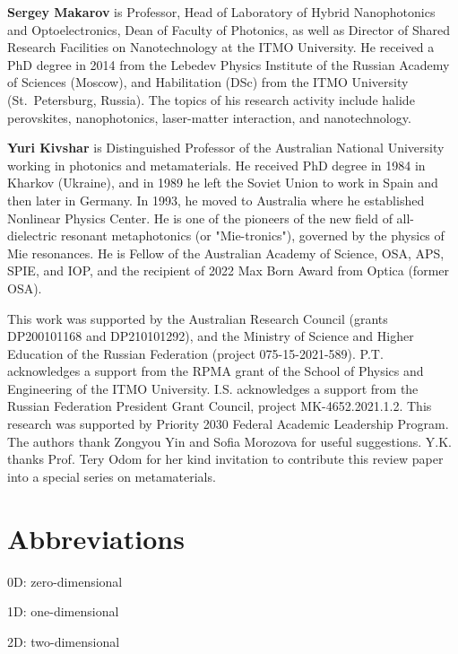\documentclass[journal=chreay,manuscript=review]{achemso}
\begin{document}
{\bf Sergey Makarov} is Professor, Head of Laboratory of Hybrid Nanophotonics and Optoelectronics, Dean of Faculty of Photonics, as well as Director of Shared Research Facilities on Nanotechnology at the ITMO University. He received a PhD degree in 2014 from the Lebedev Physics Institute of the Russian Academy of Sciences (Moscow), and Habilitation (DSc) from the ITMO University (St.~Petersburg, Russia). The topics of his research activity include halide perovskites, nanophotonics, laser-matter interaction, and nanotechnology.

{\bf Yuri Kivshar} is Distinguished Professor of the Australian National University working in photonics and metamaterials. He received PhD degree in 1984 in Kharkov (Ukraine), and in 1989 he
left the Soviet Union to work in Spain and then later in Germany. In 1993, he moved to Australia where he established Nonlinear Physics Center. He is one of the pioneers of the new field of all-dielectric resonant metaphotonics (or "Mie-tronics"), governed by the physics of Mie resonances. He is Fellow of the Australian Academy of Science, OSA, APS, SPIE, and IOP, and the recipient of 2022 Max Born Award from Optica (former OSA). 

\begin{acknowledgement}

This work was supported by the Australian Research Council (grants DP200101168 and DP210101292), and the Ministry of Science and Higher Education of the Russian Federation (project 075-15-2021-589). P.T. acknowledges a support from the RPMA grant of the School of Physics and Engineering of the ITMO University. I.S. acknowledges a support from the Russian Federation President Grant Council, project MK-4652.2021.1.2. This research was supported by Priority 2030 Federal Academic Leadership Program. The authors thank Zongyou Yin and Sofia Morozova for useful suggestions. Y.K. thanks Prof. Tery Odom for her kind invitation to contribute this review paper into a special series on metamaterials. 

\end{acknowledgement}

\newpage 

\section*{Abbreviations}
0D: zero-dimensional

1D: one-dimensional

2D: two-dimensional
\end{document}
